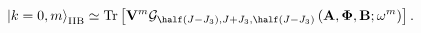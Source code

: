 \begin{equation}
\left| k=0, m \right>_{\mathrm{IIB}} \simeq \mathrm{Tr} \left[ \mathbf{V}^m
             \mathcal{G}_{\half (J-J_3),J + J_3,\half (J-J_3)} 
                \left( \mathbf{A}, \mathbf{\Phi}, \mathbf{B}; \omega^m \right) 
                    \right].
\end{equation}

